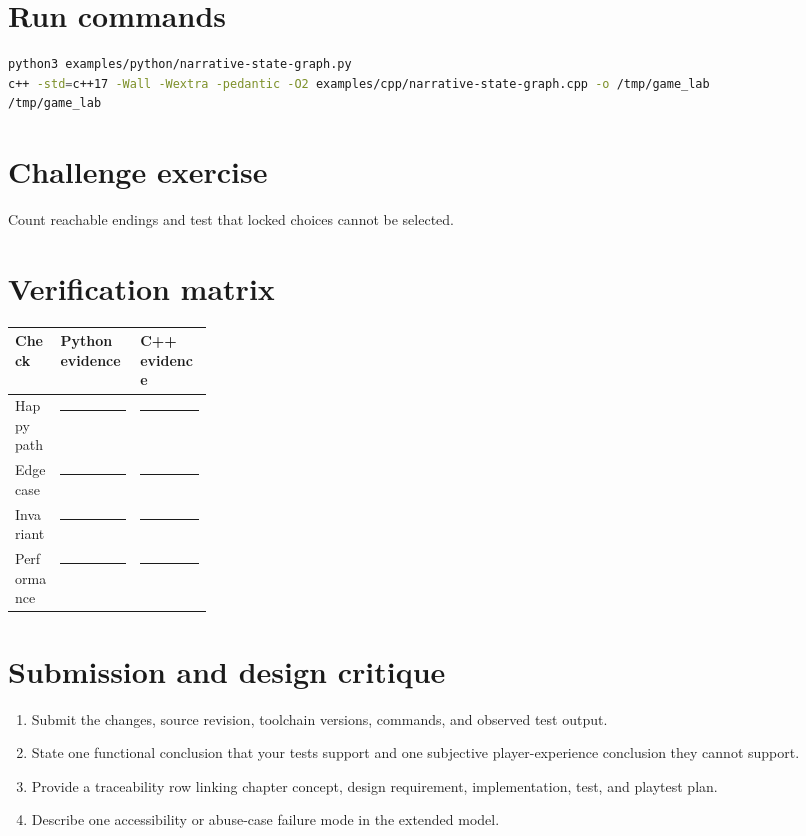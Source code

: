 \documentclass[11pt]{article}
\begin{document}
\section{Run commands}
\begin{lstlisting}[language=bash]
python3 examples/python/narrative-state-graph.py
c++ -std=c++17 -Wall -Wextra -pedantic -O2 examples/cpp/narrative-state-graph.cpp -o /tmp/game_lab
/tmp/game_lab
\end{lstlisting}

\section{Challenge exercise}
Count reachable endings and test that locked choices cannot be selected.


\section{Verification matrix}
\begin{tabularx}{\linewidth}{@{}p{0.23\linewidth}X X@{}}\toprule Check & Python evidence & C++ evidence\\\midrule
Happy path & \rule{0.85\linewidth}{0.4pt} & \rule{0.85\linewidth}{0.4pt}\\[0.35cm]
Edge case & \rule{0.85\linewidth}{0.4pt} & \rule{0.85\linewidth}{0.4pt}\\[0.35cm]
Invariant & \rule{0.85\linewidth}{0.4pt} & \rule{0.85\linewidth}{0.4pt}\\[0.35cm]
Performance & \rule{0.85\linewidth}{0.4pt} & \rule{0.85\linewidth}{0.4pt}\\\bottomrule\end{tabularx}

\section{Submission and design critique}
\begin{enumerate}
\item Submit the changes, source revision, toolchain versions, commands, and observed test output.
\item State one functional conclusion that your tests support and one subjective player-experience conclusion they cannot support.
\item Provide a traceability row linking chapter concept, design requirement, implementation, test, and playtest plan.
\item Describe one accessibility or abuse-case failure mode in the extended model.
\end{enumerate}
\end{document}
